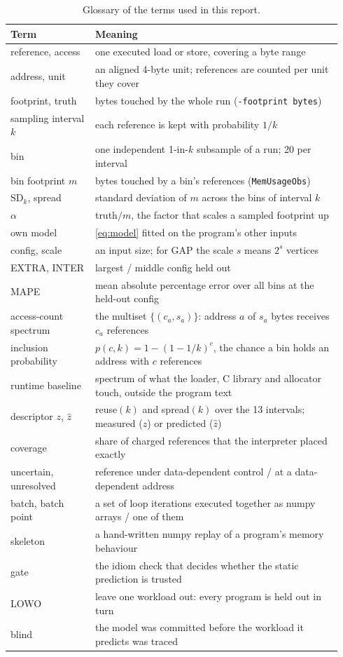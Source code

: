 \documentclass[11pt]{article}
\newcommand{\code}[1]{\texttt{#1}}
\begin{document}
\begin{table}[!htbp]
\centering\small
\caption{Glossary of the terms used in this report.}
\label{tab:glossary}
\begin{tabular}{>{\raggedright\arraybackslash}p{0.24\linewidth}>{\raggedright\arraybackslash}p{0.7\linewidth}}
\toprule
Term & Meaning \\
\midrule
reference, access & one executed load or store, covering a byte range \\
address, unit & an aligned 4-byte unit; references are counted per unit they cover \\
footprint, truth & bytes touched by the whole run (\code{-footprint bytes}) \\
sampling interval $k$ & each reference is kept with probability $1/k$ \\
bin & one independent 1-in-$k$ subsample of a run; 20 per interval \\
bin footprint $m$ & bytes touched by a bin's references (\code{MemUsageObs}) \\
$\mathrm{SD}_k$, spread & standard deviation of $m$ across the bins of interval $k$ \\
$\alpha$ & truth$/m$, the factor that scales a sampled footprint up \\
own model & \eqref{eq:model} fitted on the program's other inputs \\
config, scale & an input size; for GAP the scale $s$ means $2^s$ vertices \\
EXTRA, INTER & largest / middle config held out \\
MAPE & mean absolute percentage error over all bins at the held-out config \\
access-count spectrum & the multiset $\{(c_a, s_a)\}$: address $a$ of $s_a$ bytes receives $c_a$ references \\
inclusion probability & $p(c,k)=1-(1-1/k)^c$, the chance a bin holds an address with $c$ references \\
runtime baseline & spectrum of what the loader, C library and allocator touch, outside the program text \\
descriptor $z$, $\hat z$ & reuse$(k)$ and spread$(k)$ over the 13 intervals; measured ($z$) or predicted ($\hat z$) \\
coverage & share of charged references that the interpreter placed exactly \\
uncertain, unresolved & reference under data-dependent control / at a data-dependent address \\
batch, batch point & a set of loop iterations executed together as numpy arrays / one of them \\
skeleton & a hand-written numpy replay of a program's memory behaviour \\
gate & the idiom check that decides whether the static prediction is trusted \\
LOWO & leave one workload out: every program is held out in turn \\
blind & the model was committed before the workload it predicts was traced \\
\bottomrule
\end{tabular}
\end{table}
\end{document}
